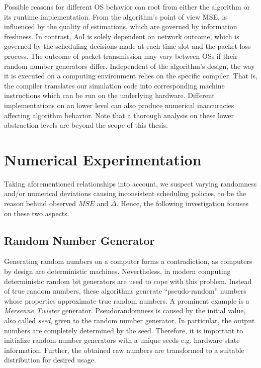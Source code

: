 Possible reasons for different OS behavior can root from either the algorithm or
its runtime implementation. From the algorithm's point of view MSE, is
influenced by the quality of estimations, which are governed by information
freshness. In contrast, AoI is solely dependent on network outcome, which is
governed by the scheduling decisions made at each time slot and the packet loss
process. The outcome of packet transmission may vary between OSs if their random
number generators differ. Independent of the algorithm's design, the way it is
executed on a computing environment relies on the specific compiler. That is,
the compiler translates our simulation code into corresponding machine
instructions which can be run on the underlying hardware. Different
implementations on an lower level can also produce numerical inaccuracies
affecting algorithm behavior. Note that a thorough analysis on these lower
abstraction levels are beyond the scope of this thesis.


\section{Numerical Experimentation} \label{sec:experiments}

Taking aforementioned relationships into account, we suspect varying randomness
and/or numerical deviations causing inconsistent scheduling policies, to be the
reason behind observed $\overline{MSE}$ and $\overline{\Delta}$. Hence, the
following investigation focuses on these two aspects.

\subsection{Random Number Generator}

Generating random numbers on a computer forms a contradiction, as computers by
design are deterministic machines. Nevertheless, in modern computing
deterministic random bit generators are used to cope with this problem. Instead
of true random numbers, these algorithms generate ``pseudo-random'' numbers
whose properties approximate true random numbers. A prominent example is a
\textit{Mersenne Twister} generator. Pseudorandomness is caused by the initial
value, also called \textit{seed}, given to the random number generator. In
particular, the output numbers are completely determined by the seed. Therefore,
it is important to initialize random number generators with a unique seeds e.g.
hardware state information. Further, the obtained raw numbers are transformed to
a suitable distribution for desired usage.

